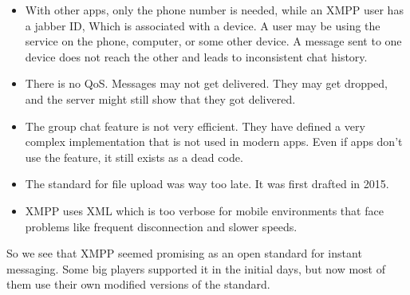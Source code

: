 \documentclass[12pt, conference, a4paper]{article}
\begin{document}
\begin{itemize}
\item With other apps, only the phone number is needed, while an XMPP user has a jabber ID, Which is associated with a device. A user may be using the service on the phone, computer, or some other device. A message sent to one device does not reach the other and leads to inconsistent chat history.
\item There is no QoS. Messages may not get delivered. They may get dropped, and the server might still show that they got delivered.
\item The group chat feature is not very efficient. They have defined a very complex implementation that is not used in modern apps. Even if apps don't use the feature, it still exists as a dead code.
\item The standard for file upload was way too late. It was first drafted in 2015.
\item XMPP uses XML which is too verbose for mobile environments that face problems like frequent disconnection and slower speeds. 
\end{itemize}
So we see that XMPP seemed promising as an open standard for instant messaging. Some big players supported it in the initial days, but now most of them use their own modified versions of the standard.
\end{document}
